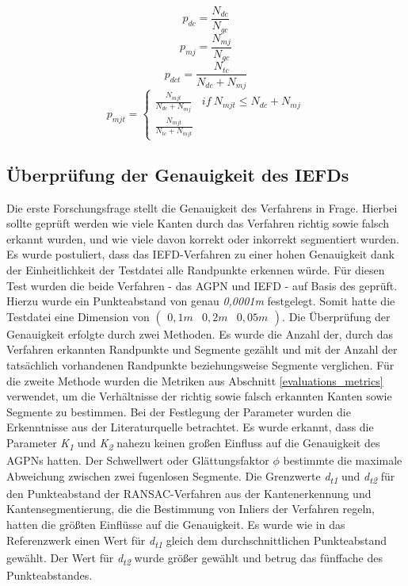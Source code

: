 \begin{equation}
	\label{pdc}
	p_{dc} = \frac{N_{dc}}{N_{gc}}
\end{equation}
\begin{equation}
	\label{pmj}
	p_{mj} = \frac{N_{mj}}{N_{gc}}
\end{equation}
\begin{equation}
	\label{pdct}
	p_{dct} = \frac{N_{tc}}{N_{dc} + N_{mj}}
\end{equation}
\begin{equation}
	\label{pmjt}
	p_{mjt} =
	\begin{cases}
		\frac{N_{mjt}}{N_{dc} + N_{mj}} & if\ N_{mjt} \leq N_{dc} + N_{mj}\\
		\frac{N_{mjt}}{N_{tc} + N_{mjt}}
	\end{cases}
\end{equation}

\subsection{Überprüfung der Genauigkeit des IEFDs} \label{test_1}
Die erste Forschungsfrage stellt die Genauigkeit des Verfahrens in Frage. Hierbei sollte geprüft werden wie viele Kanten durch das Verfahren richtig sowie falsch erkannt wurden, und wie viele davon korrekt oder inkorrekt segmentiert wurden. Es wurde postuliert, dass das IEFD-Verfahren zu einer hohen Genauigkeit dank der Einheitlichkeit der Testdatei alle Randpunkte erkennen würde. Für diesen Test wurden die beide Verfahren - das AGPN und IEFD - auf Basis des \testcloud geprüft. Hierzu wurde ein Punkteabstand von genau \textit{0,0001m} festgelegt. Somit hatte die Testdatei eine Dimension von $\left(\begin{smallmatrix}
	0,1m & 0,2m & 0,05m
\end{smallmatrix}\right)$. Die Überprüfung der Genauigkeit erfolgte durch zwei Methoden. Es wurde die Anzahl der, durch das Verfahren erkannten Randpunkte und Segmente gezählt und mit der Anzahl der tatsächlich vorhandenen Randpunkte beziehungsweise Segmente verglichen. Für die zweite Methode wurden die Metriken aus Abschnitt \ref{evaluations_metrics} verwendet, um die Verhältnisse der richtig sowie falsch erkannten Kanten sowie Segmente zu bestimmen. Bei der Festlegung der Parameter wurden die Erkenntnisse aus der Literaturquelle betrachtet. Es wurde erkannt, dass die Parameter \textit{K\textsubscript{1}} und \textit{K\textsubscript{2}} nahezu keinen großen Einfluss auf die Genauigkeit des AGPNs hatten. Der Schwellwert oder Glättungsfaktor $\phi$ bestimmte die maximale Abweichung zwischen zwei fugenlosen Segmente. Die Grenzwerte \textit{d\textsubscript{t1}} und \textit{d\textsubscript{t2}} für den Punkteabstand der RANSAC-Verfahren aus der Kantenerkennung und Kantensegmentierung, die die Bestimmung von Inliers der Verfahren regeln, hatten die größten Einflüsse auf die Genauigkeit. Es wurde wie in das Referenzwerk einen Wert für \textit{d\textsubscript{t1}} gleich dem durchschnittlichen Punkteabstand gewählt. Der Wert für \textit{d\textsubscript{t2}} wurde größer gewählt und betrug das fünffache des Punkteabstandes. \autocite[10-11]{ni_edge_2016}

